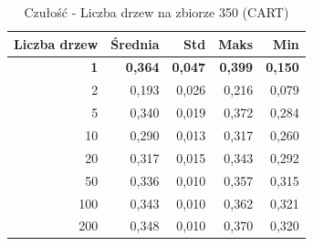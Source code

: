 \begin{table}[htbp]
\centering
\small
\setlength{\tabcolsep}{6pt}
\renewcommand{\arraystretch}{1.2}
\caption{Czułość - Liczba drzew na zbiorze 350 (CART)}
\label{tab:CART_tree_count_350_recall}
\begin{tabular}{r|r|r|r|r}
\toprule
Liczba drzew & Średnia & Std & Maks & Min \\
\hline
\textbf{1} & \textbf{0,364} & \textbf{0,047} & \textbf{0,399} & \textbf{0,150} \\
2 & 0,193 & 0,026 & 0,216 & 0,079 \\
5 & 0,340 & 0,019 & 0,372 & 0,284 \\
10 & 0,290 & 0,013 & 0,317 & 0,260 \\
20 & 0,317 & 0,015 & 0,343 & 0,292 \\
50 & 0,336 & 0,010 & 0,357 & 0,315 \\
100 & 0,343 & 0,010 & 0,362 & 0,321 \\
200 & 0,348 & 0,010 & 0,370 & 0,320 \\
\bottomrule
\end{tabular}
\end{table}